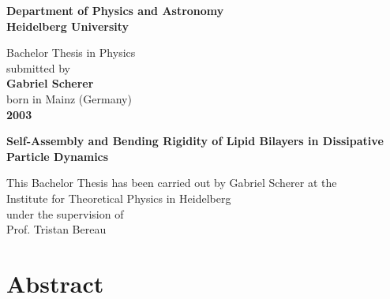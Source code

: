 \documentclass[
    11pt,
    a4paper,
    oneside,        %
    BCOR=10mm,      %
    parskip=half,   %
    listof=nototoc,   %
    bibliography=totoc %
]{scrreprt}
\begin{document}
\onehalfspacing


\begin{titlepage}
\pagestyle{plain}

\begin{center}
 
\Large\textbf{Department of Physics and Astronomy\\
Heidelberg University}

\vspace{18cm}

\normalsize
Bachelor Thesis in Physics\\
submitted by\\
\vspace{0.5cm}
\Large\textbf{Gabriel Scherer}\\
\normalsize
\vspace{0.5cm}
born in Mainz (Germany)\\
\vspace{0.5cm}
\Large\textbf{2003}
\normalsize

\newpage




\Large\textbf{Self-Assembly and Bending Rigidity of Lipid Bilayers in Dissipative Particle Dynamics}

\vspace{18cm}

\normalsize
This Bachelor Thesis has been carried out by Gabriel Scherer at the\\
Institute for Theoretical Physics in Heidelberg\\
under the supervision of\\
Prof. Tristan Bereau

\vfill
\end{center}

\end{titlepage}

\chapter*{Abstract}
\end{document}
